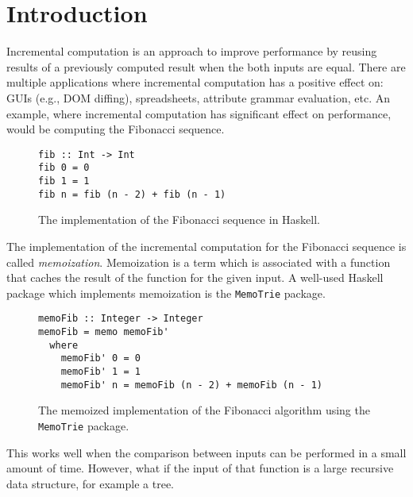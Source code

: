 \chapter{Introduction}



Incremental computation is an approach to improve performance by reusing results of a previously computed result when the both inputs are equal. There are multiple applications where incremental computation has a positive effect on: GUIs (e.g., DOM diffing), spreadsheets, attribute grammar evaluation, etc.  An example, where incremental computation has significant effect on performance, would be computing the Fibonacci sequence.

\begin{figure}[H]
\captionsetup{justification=justified,singlelinecheck=false,margin=0cm}
\begin{verbatim}
fib :: Int -> Int
fib 0 = 0
fib 1 = 1
fib n = fib (n - 2) + fib (n - 1)
\end{verbatim}
\caption{The implementation of the Fibonacci sequence in Haskell.}
\label{fig-fib-alg}
\end{figure}

The implementation of the incremental computation for the Fibonacci sequence is called \textit{memoization}. Memoization is a term which is associated with a function that caches the result of the function for the given input. A well-used Haskell package which implements memoization is the \texttt{MemoTrie} package\cite*{hackage2022memotrie}.

\begin{figure}[H]
\captionsetup{justification=justified,singlelinecheck=false,margin=0cm}
\begin{verbatim}
memoFib :: Integer -> Integer
memoFib = memo memoFib'
  where
    memoFib' 0 = 0
    memoFib' 1 = 1
    memoFib' n = memoFib (n - 2) + memoFib (n - 1)
\end{verbatim}
\caption{The memoized implementation\cite*{memotrie2022fibonacci} of the Fibonacci algorithm using the \texttt{MemoTrie} package.}
\label{fig-mem-fib-alg}
\end{figure}

This works well when the comparison between inputs can be performed in a small amount of time. However, what if the input of that function is a large recursive data structure, for example a tree. 

